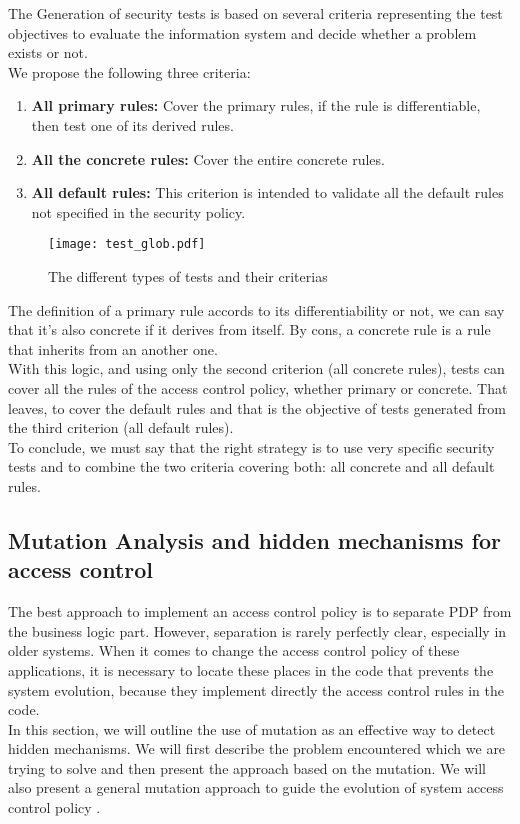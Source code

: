 \documentclass{acm_proc_article-sp}
\begin{document}
The Generation of security tests is based on several criteria representing the test objectives to evaluate the information system and decide whether a problem exists or not.\\
We propose the following three criteria:
\begin{enumerate}
 \item \textbf{All primary rules:} Cover the primary rules, if the rule is differentiable, then test one of its derived rules.
 \item \textbf{All the concrete rules:} Cover the entire concrete rules.
 \item \textbf{All default rules:} This criterion is intended to validate all the default rules not specified in the security policy.
\end{enumerate}
\begin{figure}[h!]                                                       \centering                                                               \texttt{[image: test\_glob.pdf]}          \caption{The different types of tests and their criterias}               \label{The different types of tests and their criterias}                 \end{figure}                                                             The definition of a primary rule accords to its differentiability or not, we can say that it's also concrete if it derives from itself. By cons, a concrete rule is a rule that inherits from an another one.\\
With this logic, and using only the second criterion (all concrete rules), tests can cover all the rules of the access control policy, whether primary or concrete. That leaves, to cover the default rules and that is the objective of tests generated from the third criterion (all default rules).\\
To conclude, we must say that the right strategy is to use very specific security tests and to combine the two criteria covering both: all concrete and all default rules.

\subsection{Mutation Analysis and hidden mechanisms for access control }
The best approach to implement an access control policy is to separate PDP from the  business logic part. However, separation is rarely perfectly clear, especially in older systems. When it comes to change the access control policy of these applications, it is necessary to locate these places in the code that prevents the system evolution, because they implement directly the access control rules in the code.\\
In this section, we will outline the use of mutation as an effective way to detect hidden mechanisms. We will first describe the problem encountered which we are trying to solve and then present the approach based on the mutation. We will also present a general mutation approach to guide the evolution of system access control policy .
\end{document}
